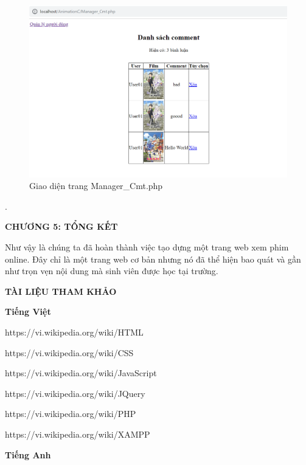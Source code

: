 \documentclass{report}
\begin{document}
\begin{center}
    \begin{figure}[htp]
    \begin{center}
     \includegraphics[scale=0.6]{10.png}
    \end{center}
    \caption{Giao diện trang Manager\_Cmt.php}
    \label{refhinh1}
    \end{figure}
\end{center}


.


\newpage
\changefontsizes{16pt}
\centerline{\textbf{CHƯƠNG 5: TỔNG KẾT}}

\bigskip
\changefontsizes{13pt}
\setlength{\parindent}{1cm}
Như vậy là chúng ta đã hoàn thành việc tạo dựng một trang web xem phim online. Đây chỉ là một trang web cơ bản nhưng nó đã thể hiện bao quát và gần như trọn vẹn nội dung mà sinh viên được học tại trường.

\newpage



\newpage
\newpage
\changefontsizes{16pt}
\centerline{\textbf{TÀI LIỆU THAM KHẢO}}

\vspace{1.2cm}
\changefontsizes{14pt}
\textbf{Tiếng Việt}

\bigskip
\setlength{\parindent}{1cm}

https://vi.wikipedia.org/wiki/HTML

https://vi.wikipedia.org/wiki/CSS

https://vi.wikipedia.org/wiki/JavaScript

https://vi.wikipedia.org/wiki/JQuery

https://vi.wikipedia.org/wiki/PHP

https://vi.wikipedia.org/wiki/XAMPP



\vspace{3cm}
\textbf{Tiếng Anh}
\end{document}
